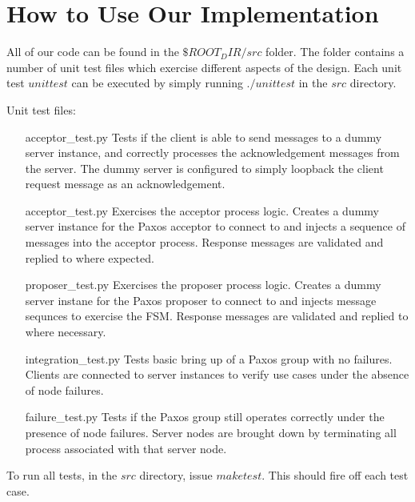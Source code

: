 \documentclass{article}
\begin{document}

\section{How to Use Our Implementation}

All of our code can be found in the $\${ROOT_DIR}/src$ folder.
The folder contains a number of unit test files which exercise different aspects of the design.
Each unit test $unittest$ can be executed by simply running $./unittest$ in the $src$ directory.

Unit test files:
\begin{itemize}
\item [acceptor\_test.py] Tests if the client is able to send messages to a dummy server instance, and correctly processes the acknowledgement messages from the server. 
  The dummy server is configured to simply loopback the client request message as an acknowledgement.
\item [acceptor\_test.py] Exercises the acceptor process logic. 
  Creates a dummy server instance for the Paxos acceptor to connect to and injects a sequence of messages into the acceptor process. 
  Response messages are validated and replied to where expected.
\item [proposer\_test.py] Exercises the proposer process logic.
  Creates a dummy server instane for the Paxos proposer to connect to and injects message sequnces to exercise the FSM.
  Response messages are validated and replied to where necessary.
\item [integration\_test.py] Tests basic bring up of a Paxos group with no failures.
  Clients are connected to server instances to verify use cases under the absence of node failures.
\item [failure\_test.py] Tests if the Paxos group still operates correctly under the presence of node failures.
  Server nodes are brought down by terminating all process associated with that server node.
\end{itemize}

To run all tests, in the $src$ directory, issue $make test$.
This should fire off each test case.

\end{document}
